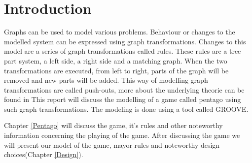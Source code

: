 \section{Introduction}
\label{Introduction}
Graphs can be used to model various problems.
Behaviour or changes to the modelled system can be expressed using graph transformations.
Changes to this model are a series of graph transformations called rules.
These rules are a tree part system, a left side, a right side and a matching graph.
When the two transformations are executed, from left to right, parts of the graph will be removed and new parts will be added.
This way of modelling graph transformations are called push-outs, more about the underlying theorie can be found in %
This report will discuss the modelling of a game called pentago using such graph transformations. 
The modeling is done using a tool called GROOVE.

\vspace{6pt}

Chapter \ref{Pentago} will discuss the game, it's rules and other noteworthy information concerning the playing of the game. After discussing the game we will present our model of the game, mayor rules and noteworthy design choices(Chapter \ref{Design}).